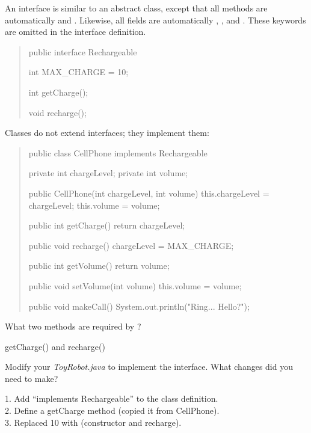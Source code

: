 
An interface is similar to an abstract class, except that all methods are automatically  and .
Likewise, all fields are automatically , , and .
These keywords are omitted in the interface definition.

\begin{quote}
\begin{javalst}
public interface Rechargeable {
    int MAX_CHARGE = 10;

    int getCharge();

    void recharge();
}
\end{javalst}
\end{quote}

Classes do not extend interfaces; they implement them:

\begin{quote}
\begin{javalst}
public class CellPhone implements Rechargeable {
    private int chargeLevel;
    private int volume;

    public CellPhone(int chargeLevel, int volume) {
        this.chargeLevel = chargeLevel;
        this.volume = volume;
    }

    public int getCharge() {
        return chargeLevel;
    }

    public void recharge() {
        chargeLevel = MAX_CHARGE;
    }

    public int getVolume() {
        return volume;
    }

    public void setVolume(int volume) {
        this.volume = volume;
    }

    public void makeCall() {
        System.out.println("Ring... Hello?");
    }
}
\end{javalst}
\end{quote}



\Q What two methods are required by ?

\begin{answer}[2em]
getCharge() and recharge()
\end{answer}


\Q Modify your \textit{ToyRobot.java} to implement the  interface.
What changes did you need to make?

\begin{answer}[5em]
1. Add ``implements Rechargeable'' to the class definition. \\[1ex]
2. Define a getCharge method (copied it from CellPhone). \\[1ex]
3. Replaced 10 with  (constructor and recharge).
\end{answer}


